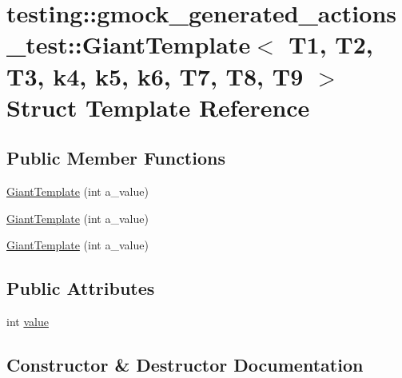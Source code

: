 \hypertarget{structtesting_1_1gmock__generated__actions__test_1_1_giant_template}{}\section{testing\+::gmock\+\_\+generated\+\_\+actions\+\_\+test\+::Giant\+Template$<$ T1, T2, T3, k4, k5, k6, T7, T8, T9 $>$ Struct Template Reference}
\label{structtesting_1_1gmock__generated__actions__test_1_1_giant_template}
\subsection*{Public Member Functions}
\begin{DoxyCompactItemize}
\item 
\mbox{\hyperlink{structtesting_1_1gmock__generated__actions__test_1_1_giant_template_aaa836b162de31fbd538ffcbed448f430}{Giant\+Template}} (int a\+\_\+value)
\item 
\mbox{\hyperlink{structtesting_1_1gmock__generated__actions__test_1_1_giant_template_aaa836b162de31fbd538ffcbed448f430}{Giant\+Template}} (int a\+\_\+value)
\item 
\mbox{\hyperlink{structtesting_1_1gmock__generated__actions__test_1_1_giant_template_aaa836b162de31fbd538ffcbed448f430}{Giant\+Template}} (int a\+\_\+value)
\end{DoxyCompactItemize}
\subsection*{Public Attributes}
\begin{DoxyCompactItemize}
\item 
int \mbox{\hyperlink{structtesting_1_1gmock__generated__actions__test_1_1_giant_template_afa0f7a8e5ac8c8b7c59d60ad66980856}{value}}
\end{DoxyCompactItemize}


\subsection{Constructor \& Destructor Documentation}
\mbox{\label{structtesting_1_1gmock__generated__actions__test_1_1_giant_template_aaa836b162de31fbd538ffcbed448f430}} 
